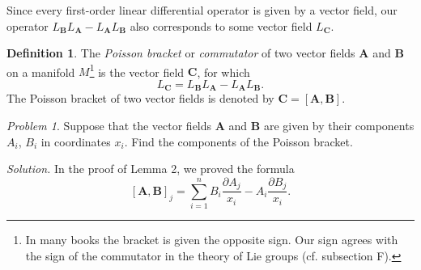 \documentclass{book}
\numberwithin{equation}{section}
\theoremstyle{plain}
\theoremstyle{definition}
\newtheorem*{defn*}{Definition}
\theoremstyle{remark}
\theoremstyle{remark}
\newtheorem*{prob*}{Problem}
\newcommand{\solution}[1]{\textit{Solution.} #1}
\begin{document}
Since every first-order linear differential operator is given by
a vector field, our operator
$L_\mathbf{B} L_\mathbf{A} - L_\mathbf{A} L_\mathbf{B}$
also corresponds to some vector field $L_\mathbf{C}$.


\begin{defn*}
  The \emph{Poisson bracket} or \emph{commutator}
  of two vector fields $\mathbf A$ and $\mathbf B$
  on a manifold $M$\footnote{In many books the bracket
    is given the opposite sign.
    Our sign agrees with  the sign of the commutator
    in the theory of Lie groups (cf. subsection F).}
  is the vector field $\mathbf C$, for which
  $$
  L_\mathbf{C} = L_\mathbf{B} L_\mathbf{A} - L_\mathbf{A} L_\mathbf{B}.
  $$
  The Poisson bracket of two vector fields is denoted by
  $\mathbf C = [ \mathbf A, \mathbf B ]$.
\end{defn*}

\begin{prob*}
  Suppose that the vector fields $\mathbf A$ and $\mathbf B$
  are given by their components $A_i$, $B_i$ in coordinates $x_i$.
  Find the components of the Poisson bracket.

  \solution{
    In the proof of Lemma 2, we proved the formula
    $$
    [\mathbf A, \mathbf B]_j =
    \sum_{i = 1}^n
      B_i \frac{ \partial A_j }{ x_i }
      -
      A_i \frac{ \partial B_j }{ x_i }.
    $$
  }
\end{prob*}
\end{document}
